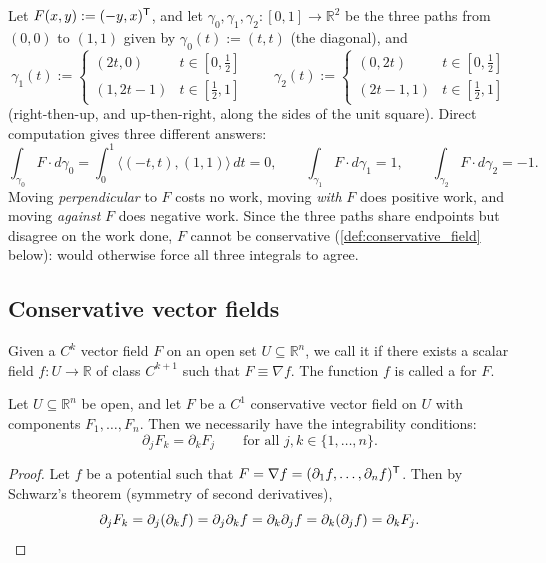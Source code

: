 \begin{example}
\label{ex:path_dependence_three_paths}
Let $F(x,y) := (-y,x)^{\mathsf{T}}$, and let $\gamma_0,\gamma_1,\gamma_2 : [0,1] \to \mathbb{R}^2$ be
the three paths from $(0,0)$ to $(1,1)$ given by $\gamma_0(t) := (t,t)$ (the diagonal), and
\[\gamma_1(t) := \begin{cases}(2t,0) & t\in[0,\tfrac12]\\ (1,2t{-}1) & t\in[\tfrac12,1]\end{cases}
  \qquad
  \gamma_2(t) := \begin{cases}(0,2t) & t\in[0,\tfrac12]\\ (2t{-}1,1) & t\in[\tfrac12,1]\end{cases}\]
(right-then-up, and up-then-right, along the sides of the unit square). Direct computation
gives three different answers:
\[\int_{\gamma_0}F\cdot d\gamma_0 = \int_0^1\langle(-t,t),(1,1)\rangle\,dt = 0, \qquad
  \int_{\gamma_1}F\cdot d\gamma_1 = 1, \qquad \int_{\gamma_2}F\cdot d\gamma_2 = -1.\]
Moving \emph{perpendicular} to $F$ costs no work, moving \emph{with} $F$ does positive work, and
moving \emph{against} $F$ does negative work. Since the three paths share endpoints but
disagree on the work done, $F$ cannot be conservative (\cref{def:conservative_field} below):
 would otherwise force all three integrals to agree.
\end{example}

\subsection{Conservative vector fields}

\begin{definition}
\label{def:conservative_field}
Given a $C^k$ vector field $F$ on an open set $U \subseteq \mathbb{R}^n$, we call it  if there exists a scalar field $f : U \to \mathbb{R}$ of class $C^{k+1}$ such that $F \equiv \nabla f$. The function $f$ is called a  for $F$.
\end{definition}

\begin{lemma}
\label{lem:integrability_conditions}
Let $U \subseteq \mathbb{R}^n$ be open, and let $F$ be a $C^1$ conservative vector field on $U$ with components $F_1, \dots, F_n$. Then we necessarily have the integrability conditions:
\[\partial_j F_k = \partial_k F_j \qquad \text{for all } j, k \in \{1,\dots,n\}.\]
\end{lemma}
\begin{proof}
Let $f$ be a potential such that $F = \nabla f = (\partial_1 f, \dots, \partial_n f)^{\mathsf{T}}$. Then by Schwarz's theorem (symmetry of second derivatives),
\[\partial_j F_k = \partial_j(\partial_k f) = \partial_j\partial_k f = \partial_k\partial_j f = \partial_k(\partial_j f) = \partial_k F_j.\qedhere\]
\end{proof}

